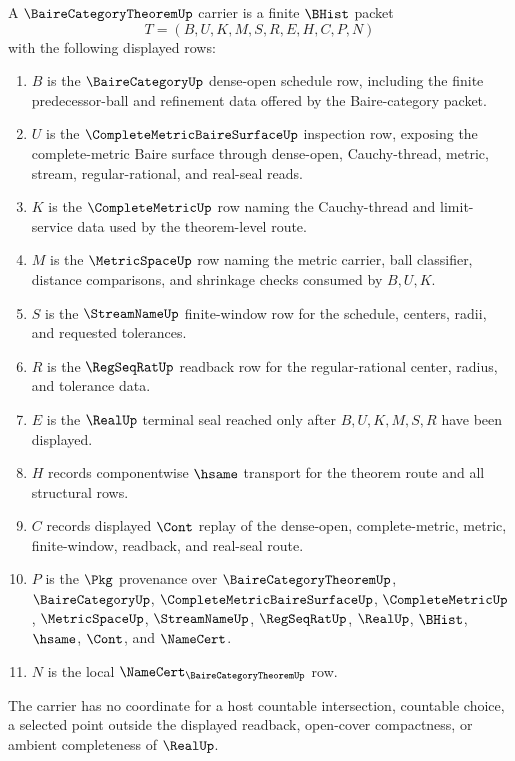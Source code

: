 \begin{definition}
\label{def:baire-category-theorem-carrier}
A $\BaireCategoryTheoremUp$ carrier is a finite $\BHist$ packet
$$
T=(B,U,K,M,S,R,E,H,C,P,N)
$$
with the following displayed rows:
\begin{enumerate}
\item $B$ is the $\BaireCategoryUp$ dense-open schedule row, including the finite predecessor-ball and refinement data offered by the Baire-category packet.
\item $U$ is the $\CompleteMetricBaireSurfaceUp$ inspection row, exposing the complete-metric Baire surface through dense-open, Cauchy-thread, metric, stream, regular-rational, and real-seal reads.
\item $K$ is the $\CompleteMetricUp$ row naming the Cauchy-thread and limit-service data used by the theorem-level route.
\item $M$ is the $\MetricSpaceUp$ row naming the metric carrier, ball classifier, distance comparisons, and shrinkage checks consumed by $B,U,K$.
\item $S$ is the $\StreamNameUp$ finite-window row for the schedule, centers, radii, and requested tolerances.
\item $R$ is the $\RegSeqRatUp$ readback row for the regular-rational center, radius, and tolerance data.
\item $E$ is the $\RealUp$ terminal seal reached only after $B,U,K,M,S,R$ have been displayed.
\item $H$ records componentwise $\hsame$ transport for the theorem route and all structural rows.
\item $C$ records displayed $\Cont$ replay of the dense-open, complete-metric, metric, finite-window, readback, and real-seal route.
\item $P$ is the $\Pkg$ provenance over $\BaireCategoryTheoremUp$, $\BaireCategoryUp$, $\CompleteMetricBaireSurfaceUp$, $\CompleteMetricUp$, $\MetricSpaceUp$, $\StreamNameUp$, $\RegSeqRatUp$, $\RealUp$, $\BHist$, $\hsame$, $\Cont$, and $\NameCert$.
\item $N$ is the local $\NameCert_{\BaireCategoryTheoremUp}$ row.
\end{enumerate}
The carrier has no coordinate for a host countable intersection, countable choice, a selected point outside the displayed readback, open-cover compactness, or ambient completeness of $\RealUp$.
\end{definition}

